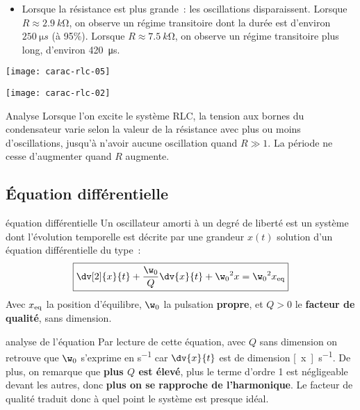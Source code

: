 \documentclass[../main/main.tex]{subfiles}
\begin{document}
\begin{itemize}
    \item Lorsque la résistance est plus grande~: les oscillations
        disparaissent. Lorsque $R \approx \SI{2,9}{k\ohm}$, on observe un régime
        transitoire dont la durée est d’environ $\SI{250}{\micro s}$ (à 95\%).
        Lorsque $R \approx \SI{7.5}{k\ohm}$, on observe un régime transitoire
        plus long, d’environ \SI{420}{\micro s}.
\end{itemize}
\begin{minipage}{0.45\linewidth}
    \begin{center}
        \texttt{[image: carac-rlc-05]}
    \end{center}
\end{minipage}
\hfill
\begin{minipage}{0.45\linewidth}
    \begin{center}
        \texttt{[image: carac-rlc-02]}
    \end{center}
\end{minipage}

\begin{instruc}{Analyse}
    Lorsque l'on excite le système RLC, la tension aux bornes du condensateur
    varie selon la valeur de la résistance avec plus ou moins d'oscillations,
    jusqu'à n'avoir aucune oscillation quand $R \gg 1$. La période ne cesse
    d'augmenter quand $R$ augmente.
\end{instruc}

\subsection{Équation différentielle}

\begin{tcbraster}[raster columns=2, raster equal height=rows]
    \begin{prop}[label=prop:eqdiffoh]{équation différentielle}
        Un oscillateur amorti à un degré de liberté est un système dont l'évolution
        temporelle est décrite par une grandeur $x(t)$ solution d'un équation
        différentielle du type~:
        \[ \boxed{ \dv[2]{x}{t} + \frac{\w_0}{Q} \dv{x}{t} + \w_0{}^2x = \w_0{}^2x_{\rm eq}}\]
        Avec $x_{\rm eq}$ la position d'équilibre, $\w_0$ la pulsation
        \textbf{propre}, et $Q >0$ le \textbf{facteur de qualité}, sans dimension.
    \end{prop}
    \begin{impl}[label=impl:eqdiffamorti]{analyse de l'équation}
        Par lecture de cette équation, avec $Q$ sans dimension on retrouve que
        $\w_0$ s'exprime en \si{s^{-1}} car $\dv{x}{t}$ est de dimension
        \si{[x].s^{-1}}.\bigbreak
        De plus, on remarque que \textbf{plus $Q$ est élevé}, plus le terme
        d'ordre 1 est négligeable devant les autres, donc \textbf{plus on se
        rapproche de l'harmonique}. Le facteur de qualité traduit donc à quel
        point le système est presque idéal.
    \end{impl}
\end{tcbraster}
\end{document}
